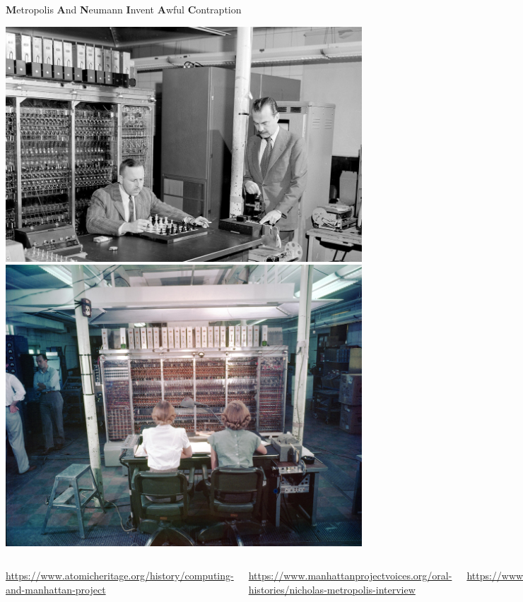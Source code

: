 \documentclass[aspectratio=169]{beamer}
\begin{document}
\begin{frame}{{\bf M}etropolis {\bf A}nd {\bf N}eumann {\bf I}nvent {\bf A}wful {\bf C}ontraption}
\small
\vspace{0.25 cm}

\includegraphics[height=5 cm]{metropolis.jpg}\hspace{0.1 cm}\includegraphics[height=5 cm]{1952-Maniac-1.jpg}

\vspace{0.25 cm}
\begin{columns}
\textcolor{blue}{\url{https://www.atomicheritage.org/history/computing-and-manhattan-project}}

\vspace{0.1 cm}
\textcolor{blue}{\url{https://www.manhattanprojectvoices.org/oral-histories/nicholas-metropolis-interview}}

\vspace{0.1 cm}
\textcolor{blue}{\url{https://www.jstor.org/stable/20025423}}

\vspace{0.1 cm}
\textcolor{blue}{\url{https://books.google.com/books?id=qB819m2ibUQC}}
\end{columns}
\end{frame}
\end{document}
